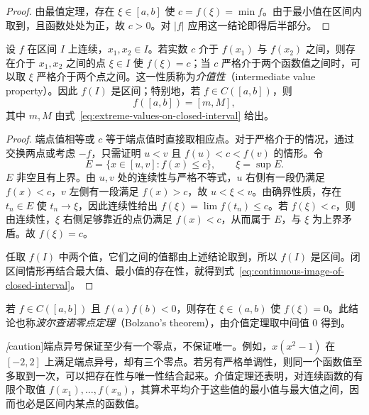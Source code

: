 \documentclass[UTF8,12pt,a4paper,fontset=fandol]{ctexbook}
\begin{document}
\begin{proof}
由最值定理，存在 $\xi\in[a,b]$ 使 $c=f(\xi)=\min f$。由于最小值在区间内取到，且函数处处为正，故 $c>0$。对 $|f|$ 应用这一结论即得后半部分。
\end{proof}

\begin{theorem}[介值定理]
\label{thm:intermediate-value-property}
设 $f$ 在区间 $I$ 上连续，$x_1,x_2\in I$。若实数 $c$ 介于 $f(x_1)$ 与 $f(x_2)$ 之间，则存在介于 $x_1,x_2$ 之间的点 $\xi\in I$ 使 $f(\xi)=c$；当 $c$ 严格介于两个函数值之间时，可以取 $\xi$ 严格介于两个点之间。这一性质称为\emph{介值性}（intermediate value property）。因此 $f(I)$ 是区间；特别地，若 $f\in C([a,b])$，则
\begin{equation}
    f([a,b])=[m,M],
    \label{eq:continuous-image-of-closed-interval}
\end{equation}
其中 $m,M$ 由式~\eqref{eq:extreme-values-on-closed-interval} 给出。
\end{theorem}

\begin{proof}
端点值相等或 $c$ 等于端点值时直接取相应点。对于严格介于的情况，通过交换两点或考虑 $-f$，只需证明 $u<v$ 且 $f(u)<c<f(v)$ 的情形。令
\[
    E=\{x\in[u,v]:f(x)\leq c\},\qquad \xi=\sup E.
\]
$E$ 非空且有上界。由 $u,v$ 处的连续性与严格不等式，$u$ 右侧有一段仍满足 $f(x)<c$，$v$ 左侧有一段满足 $f(x)>c$，故 $u<\xi<v$。由确界性质，存在 $t_n\in E$ 使 $t_n\to\xi$，因此连续性给出 $f(\xi)=\lim f(t_n)\leq c$。若 $f(\xi)<c$，则由连续性，$\xi$ 右侧足够靠近的点仍满足 $f(x)<c$，从而属于 $E$，与 $\xi$ 为上界矛盾。故 $f(\xi)=c$。

任取 $f(I)$ 中两个值，它们之间的值都由上述结论取到，所以 $f(I)$ 是区间。闭区间情形再结合最大值、最小值的存在性，就得到式~\eqref{eq:continuous-image-of-closed-interval}。
\end{proof}

\begin{corollary}[零点存在定理]
\label{cor:bolzano-zero-existence}
若 $f\in C([a,b])$ 且 $f(a)f(b)<0$，则存在 $\xi\in(a,b)$ 使 $f(\xi)=0$。此结论也称\emph{波尔查诺零点定理}（Bolzano's theorem），由介值定理取中间值 $0$ 得到。
\end{corollary}

\emph[caution]{端点异号保证至少有一个零点，不保证唯一。}例如，$x(x^2-1)$ 在 $[-2,2]$ 上满足端点异号，却有三个零点。若另有严格单调性，则同一个函数值至多取到一次，可以把存在性与唯一性结合起来。介值定理还表明，对连续函数的有限个取值 $f(x_1),\ldots,f(x_n)$，其算术平均介于这些值的最小值与最大值之间，因而也必是区间内某点的函数值。
\end{document}
